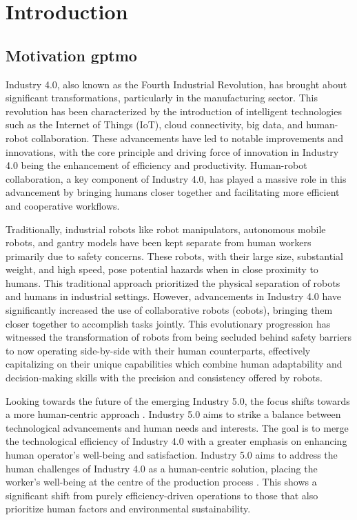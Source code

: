 \chapter{Introduction}
\label{aufbau}

\section{Motivation \gls*{gptmo}} 

Industry 4.0, also known as the Fourth Industrial Revolution, has brought about significant transformations, particularly in the manufacturing sector. This revolution has been characterized by the introduction of intelligent technologies such as the Internet of Things (IoT), cloud connectivity, big data, and human-robot collaboration. These advancements have led to notable improvements and innovations, with the core principle and driving force of innovation in Industry 4.0 being the enhancement of efficiency and productivity. Human-robot collaboration, a key component of Industry 4.0, has played a massive role in this advancement by bringing humans closer together and facilitating more efficient and cooperative workflows. 

Traditionally, industrial robots like robot manipulators, autonomous mobile robots, and gantry models have been kept separate from human workers primarily due to safety concerns. These robots, with their large size, substantial weight, and high speed, pose potential hazards when in close proximity to humans. This traditional approach prioritized the physical separation of robots and humans in industrial settings. However, advancements in Industry 4.0 have significantly increased the use of collaborative robots (cobots), bringing them closer together to accomplish tasks jointly. This evolutionary progression has witnessed the transformation of robots from being secluded behind safety barriers to now operating side-by-side with their human counterparts, effectively capitalizing on their unique capabilities which combine human adaptability and decision-making skills with the precision and consistency offered by robots.  

Looking towards the future of the emerging Industry 5.0, the focus shifts towards a more human-centric approach \parencite{industry5}. Industry 5.0 aims to strike a balance between technological advancements and human needs and interests. The goal is to merge the technological efficiency of Industry 4.0 with a greater emphasis on enhancing human operator's well-being and satisfaction.
Industry 5.0 aims to address the human challenges of Industry 4.0 as a human-centric solution, placing the worker's well-being at the centre of the production process \parencite{hum1}.
This shows a significant shift from purely efficiency-driven operations to those that also prioritize human factors and environmental sustainability. 


